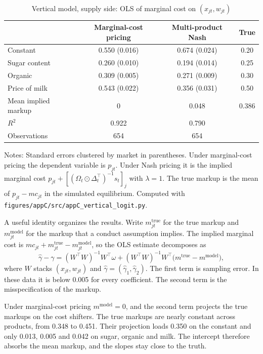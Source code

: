 \begin{table}[htbp]
\centering
\caption{Vertical model, supply side: OLS of marginal cost on $(x_{jt}, w_{jt})$}
\label{tab:C-vsupply}
\small
\begin{tabular}{@{}lccc@{}}
\toprule
 & Marginal-cost pricing & Multi-product Nash & True \\
\midrule
Constant & 0.550 (0.016) & 0.674 (0.024) & 0.20 \\
Sugar content & 0.260 (0.010) & 0.194 (0.014) & 0.25 \\
Organic & 0.309 (0.005) & 0.271 (0.009) & 0.30 \\
Price of milk & 0.543 (0.022) & 0.356 (0.031) & 0.50 \\
\midrule
Mean implied markup & 0 & 0.048 & 0.386 \\
$R^2$ & 0.922 & 0.790 & \\
Observations & 654 & 654 & \\
\bottomrule
\end{tabular}

\vspace{3pt}
\begin{minipage}{0.97\textwidth}
\footnotesize Notes: Standard errors clustered by market in parentheses. Under marginal-cost
pricing the dependent variable is $p_{jt}$. Under Nash pricing it is the implied marginal cost
$p_{jt} + [(\Omega_t \odot \Delta_t^\top)^{-1}s_t]_j$ with $\lambda = 1$. The true markup is the mean of $p_{jt} -
mc_{jt}$ in the simulated equilibrium.
Computed with \texttt{figures/appC/src/appC\_vertical\_logit.py}.
\end{minipage}
\end{table}

A useful identity organizes the results. Write $m^{\mathrm{true}}_{jt}$ for the true markup and $m^{\mathrm{model}}_{jt}$ for the markup
that a conduct assumption implies. The implied marginal cost is $mc_{jt} + m^{\mathrm{true}}_{jt} - m^{\mathrm{model}}_{jt}$, so the OLS
estimate decomposes as
\begin{equation}\label{eq:C-supplydecomp}
  \hat\gamma - \gamma = (W^\top W)^{-1}W^\top\omega + (W^\top W)^{-1}W^\top\big(m^{\mathrm{true}} - m^{\mathrm{model}}\big),
\end{equation}
where $W$ stacks $(x_{jt}, w_{jt})$ and $\hat\gamma = (\hat\gamma_1, \hat\gamma_2)$. The first term is sampling error. In
these data it is below 0.005 for every coefficient. The second term is the misspecification of the markup.

Under marginal-cost pricing $m^{\mathrm{model}} = 0$, and the second term projects the true markups on the cost shifters. The true
markups are nearly constant across products, from 0.348 to 0.451. Their projection loads 0.350 on the constant and only
0.013, 0.005 and 0.042 on sugar, organic and milk. The intercept therefore absorbs the mean markup, and the slopes stay
close to the truth.

